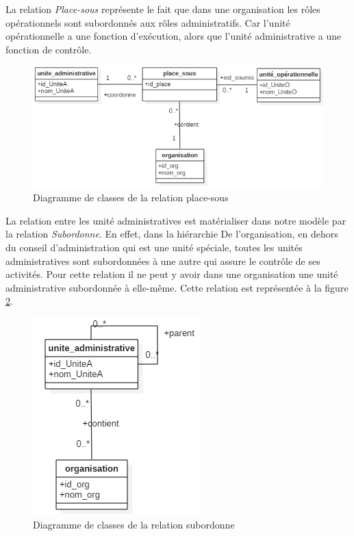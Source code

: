 La relation \textit{Place-sous} représente le fait que dans une organisation les rôles opérationnels sont subordonnés aux rôles administratifs. Car l'unité opérationnelle a une fonction d'exécution, alors que l'unité administrative a une fonction de contrôle.

\begin{figure}[h!]
    \centering
		\includegraphics[scale=0.7]{chap3/images/place-sous.png}
    \caption{Diagramme de classes de la relation place-sous}
	 \label{figplace-sous}
\end{figure} 

\label{sectionUnitéAUniteA}

La relation entre les unité administratives est matérialiser dans  notre modèle par la relation \textit{Subordonne}. En effet, dans la hiérarchie De l'organisation, en dehors du conseil d'administration qui est une unité spéciale, toutes les unités administratives sont  subordonnées à une autre qui assure le contrôle de ses activités. Pour cette relation il ne peut y avoir dans une organisation une unité administrative subordonnée à elle-même. Cette relation est représentée à la figure \ref{figsubordonne}.

\begin{figure}[h!]
    \centering
		\includegraphics[scale=0.7]{chap3/images/subordonne.png}
    \caption{Diagramme de classes de la relation subordonne}
	 \label{figsubordonne}
\end{figure} 

